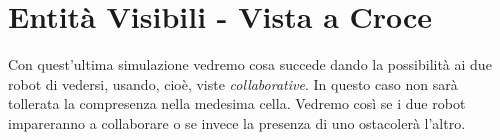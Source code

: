 \section{Entità Visibili - Vista a Croce}
Con quest'ultima simulazione vedremo cosa succede dando la possibilità ai due
robot di vedersi, usando, cioè, viste \textit{collaborative}. In questo caso non
sarà tollerata la compresenza nella medesima cella.\newline
Vedremo così se i due robot impareranno a collaborare o se invece la presenza
di uno ostacolerà l'altro.
